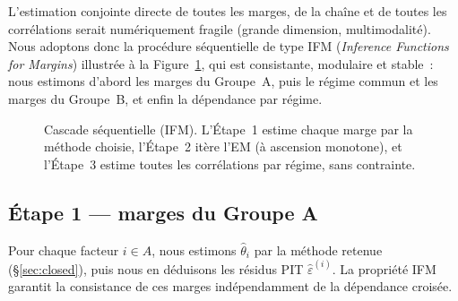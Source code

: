 \documentclass[11pt,a4paper]{article}
\theoremstyle{definition}
\newcommand{\Ecal}{\mathcal{E}}
\newcommand{\eps}{\varepsilon}
\begin{document}
\noindent L'estimation conjointe directe de toutes les marges, de la chaîne et de toutes les corrélations serait numériquement fragile (grande dimension, multimodalité). Nous adoptons donc la procédure séquentielle de type IFM (\emph{Inference Functions for Margins}) illustrée à la Figure~\ref{fig:cascade}, qui est consistante, modulaire et stable~: nous estimons d'abord les marges du Groupe~A, puis le régime commun et les marges du Groupe~B, et enfin la dépendance par régime.

\begin{figure}[H]
\centering
{}
\caption{Cascade séquentielle (IFM). L'Étape~1 estime chaque marge par la méthode choisie, l'Étape~2 itère l'EM (à ascension monotone), et l'Étape~3 estime toutes les corrélations par régime, sans contrainte.}
\label{fig:cascade}
\end{figure}

\subsection{Étape 1 --- marges du Groupe A}
Pour chaque facteur $i\in A$, nous estimons $\hat\theta_i$ par la méthode retenue (\S\ref{sec:closed}), puis nous en déduisons les résidus PIT $\widehat\eps^{(i)}$. La propriété IFM garantit la consistance de ces marges indépendamment de la dépendance croisée.
\end{document}
